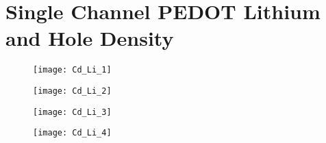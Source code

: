 \chapter{Single Channel PEDOT Lithium and Hole Density} %


\begin{figure}[!htp]
\centering
\texttt{[image: Cd\_Li\_1]}
\caption{} 
\end{figure}

\begin{figure}[!htp]
\centering
\texttt{[image: Cd\_Li\_2]}
\caption{} 
\end{figure}

\begin{figure}[!htp]
\centering
\texttt{[image: Cd\_Li\_3]}
\caption{} 
\end{figure}


\begin{figure}[!htp]
\centering
\texttt{[image: Cd\_Li\_4]}
\caption{} 
\end{figure}